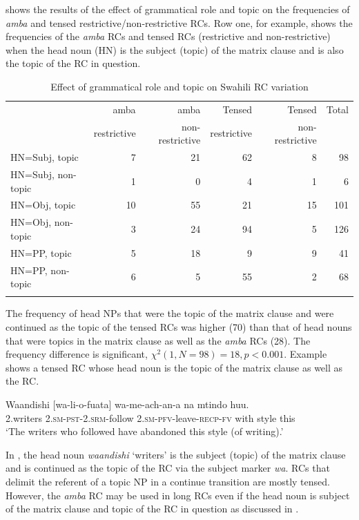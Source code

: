 \documentclass[output=paper,colorlinks,citecolor=brown]{langscibook}
\begin{document}
 shows the results of the effect of grammatical role and topic on the frequencies of \textit{amba} and tensed restrictive/non-restrictive RCs. Row one, for example, shows the frequencies of the \textit{amba} RCs and tensed RCs (restrictive and non-restrictive) when the head noun (HN) is the subject (topic) of the matrix clause and is also the topic of the RC in question.

\begin{table}
    \begin{tabularx}{\textwidth}{Xrrrrr}
    \lsptoprule
        & amba & amba & Tensed  & Tensed & Total\\
        & restrictive & non-restrictive & restrictive & non-restrictive & \\
        \midrule
        HN=Subj, topic & 7 & 21 & 62 & 8 & 98\\
        HN=Subj, non-topic & 1 & 0 & 4 & 1 & 6\\
        \midrule %
        HN=Obj, topic & 10 & 55 & 21 & 15 & 101\\
        HN=Obj, non-topic & 3 & 24 & 94 & 5 & 126\\
        \midrule %
        HN=PP, topic & 5 & 18 & 9 & 9 & 41\\
        HN=PP, non-topic & 6 & 5 & 55 & 2 & 68\\
    \lspbottomrule
    \end{tabularx}
    \caption{Effect of grammatical role and topic on Swahili RC variation}
    \label{tab:mwamzandi:2}
\end{table}

The frequency of head NPs that were the topic of the matrix clause and were continued as the topic of the tensed RCs was higher (70) than that of head nouns that were topics in the matrix clause as well as the \textit{amba} RCs (28). The frequency difference is significant, $\chi^2 (1,N=98)=18, p<0.001$. Example  shows a tensed RC whose head noun is the topic of the matrix clause as well as the RC.

\ea%
    \label{ex:mwamzandi:27}
    \gll    Waandishi [wa-li-o-fuata] wa-me-ach-an-a na mtindo huu.\\
            2.writers \textsc{2.sm-pst-2.srm-}follow \textsc{2.sm-pfv-}leave\textsc{-recp-fv} with style this\\
    \glt    ‘The writers who followed have abandoned this style (of writing).’
\z

In , the head noun \textit{waandishi} ‘writers’ is the subject (topic) of the matrix clause and is continued as the topic of the RC via the subject marker \textit{wa}. RCs that delimit the referent of a topic NP in a continue transition are mostly tensed. However, the \textit{amba} RC may be used in long RCs even if the head noun is subject of the matrix clause and topic of the RC in question as discussed in .
\end{document}
